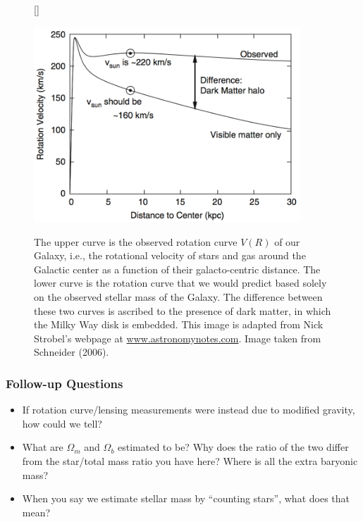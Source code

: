 \documentclass[a4paper,10pt]{article}
\begin{document}
\begin{figure}[h]
    [\FBwidth]
    {\caption{\footnotesize{The upper curve is the observed rotation curve $V(R)$ of our Galaxy, i.e., the rotational velocity of stars and gas around the Galactic center as a function of their galacto-centric distance. The lower curve is the rotation curve that we would predict based solely on the observed stellar mass of the Galaxy. The difference between these two curves is ascribed to the presence of dark matter, in which the Milky Way disk is embedded. This image is adapted from Nick Strobel's webpage at \href{www.astronomynotes.com}{www.astronomynotes.com}. Image taken from Schneider (2006).}}
    \label{fig:rotationcurve}}
    {\includegraphics[width=10cm]{figures/RotationCurve.png}}
\end{figure}

\newpage
\subsubsection{Follow-up Questions}

\begin{itemize}
    \item If rotation curve/lensing measurements were instead due to modified gravity, how could we tell?
    \item What are $\Omega_m$ and $\Omega_b$ estimated to be? Why does the ratio of the two differ from the star/total mass ratio you have here? Where is all the extra baryonic mass?
    \item When you say we estimate stellar mass by ``counting stars'', what does that mean?
\end{itemize}

\end{document}
